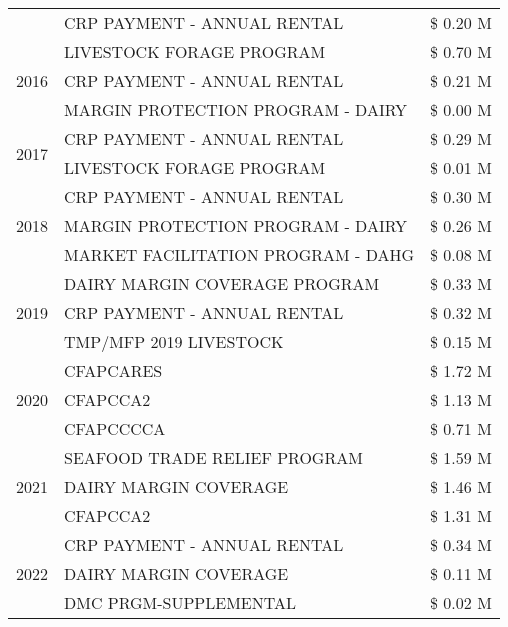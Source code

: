 \begin{tabular}{llr}
 & CRP PAYMENT - ANNUAL RENTAL & \$ 0.20 M \\
\cline{1-3}
\multirow[t]{3}{*}{2016} & LIVESTOCK FORAGE PROGRAM & \$ 0.70 M \\
 & CRP PAYMENT - ANNUAL RENTAL & \$ 0.21 M \\
 & MARGIN PROTECTION PROGRAM - DAIRY & \$ 0.00 M \\
\cline{1-3}
\multirow[t]{2}{*}{2017} & CRP PAYMENT - ANNUAL RENTAL & \$ 0.29 M \\
 & LIVESTOCK FORAGE PROGRAM & \$ 0.01 M \\
\cline{1-3}
\multirow[t]{3}{*}{2018} & CRP PAYMENT - ANNUAL RENTAL & \$ 0.30 M \\
 & MARGIN PROTECTION PROGRAM - DAIRY & \$ 0.26 M \\
 & MARKET FACILITATION PROGRAM - DAHG & \$ 0.08 M \\
\cline{1-3}
\multirow[t]{3}{*}{2019} & DAIRY MARGIN COVERAGE PROGRAM & \$ 0.33 M \\
 & CRP PAYMENT - ANNUAL RENTAL & \$ 0.32 M \\
 & TMP/MFP 2019 LIVESTOCK & \$ 0.15 M \\
\cline{1-3}
\multirow[t]{3}{*}{2020} & CFAPCARES & \$ 1.72 M \\
 & CFAPCCA2 & \$ 1.13 M \\
 & CFAPCCCCA & \$ 0.71 M \\
\cline{1-3}
\multirow[t]{3}{*}{2021} & SEAFOOD TRADE RELIEF PROGRAM & \$ 1.59 M \\
 & DAIRY MARGIN COVERAGE & \$ 1.46 M \\
 & CFAPCCA2 & \$ 1.31 M \\
\cline{1-3}
\multirow[t]{3}{*}{2022} & CRP PAYMENT - ANNUAL RENTAL & \$ 0.34 M \\
 & DAIRY MARGIN COVERAGE & \$ 0.11 M \\
 & DMC PRGM-SUPPLEMENTAL & \$ 0.02 M \\
\cline{1-3}
\bottomrule
\end{tabular}
